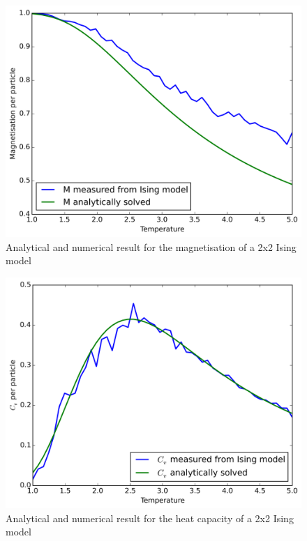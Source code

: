 \documentclass[11pt,a4paper,english,draft]{article}
\numberwithin{equation}{section}
\newcommand{\figurewidth}{.85\textwidth}
\begin{document}
\begin{figure}
\centering
\includegraphics[width=\figurewidth]{pics/aM.png}
\caption{Analytical and numerical result for the magnetisation 
of a 2x2 Ising model}
\label{fig:aM}
\end{figure}

\begin{figure}
\centering
\includegraphics[width=\figurewidth]{pics/acv.png}
\caption{Analytical and numerical result for the heat capacity 
of a 2x2 Ising model}
\label{fig:acv}
\end{figure}
\end{document}

